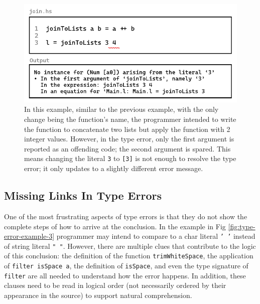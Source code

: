 \begin{figure}[hbt]
  \includegraphics[width=\linewidth]{TypeErrorExample2}
  \caption{
    \label{fig:type-error-example-2}
  In this example, similar to the previous example, with the only change being the function's name, the programmer intended to write the function to concatenate two lists but apply the function with 2 integer values. However, in the type error, only the first argument is reported as an offending code; the second argument is spared. This means changing the literal \texttt{3} to \texttt{[3]} is not enough to resolve the type error; it only updates to a slightly different error message.
    }
\end{figure}

\subsection{Missing Links In Type Errors}
\label{subsec:missing-link}

One of the most frustrating aspects of type errors is that they do not show the complete steps of how to arrive at the conclusion. In the example in Fig \ref{fig:type-error-example-3}  programmer may intend to compare to a char literal \texttt{' '} instead of string literal \texttt{" "}. However, there are multiple clues that contribute to the logic of this conclusion: the definition of the function \texttt{trimWhiteSpace}, the application of \texttt{filter isSpace a}, the definition of \texttt{isSpace}, and even the type signature of \texttt{filter} are all needed to understand how the error happens. In addition, these clauses need to be read in logical order (not necessarily ordered by their appearance in the source) to support natural comprehension. 


